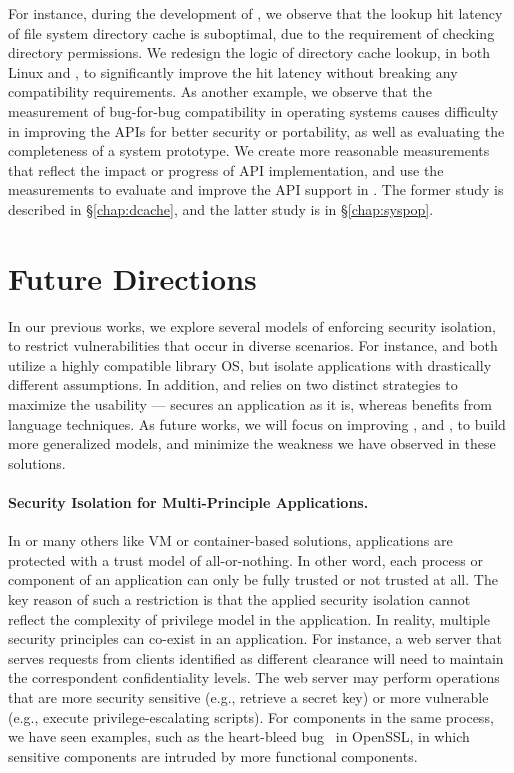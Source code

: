 {For instance, during the development of \graphene{}, we observe that the lookup hit latency of file system directory cache is suboptimal,
due to the requirement of checking directory permissions.
We redesign the logic of
directory cache lookup, in both Linux and \graphene{},
to significantly improve the hit latency without breaking any compatibility requirements.
As another example, we observe that the measurement of bug-for-bug compatibility in operating systems causes difficulty in improving the APIs for better security or portability,
as well as evaluating the completeness of a system prototype.
We create more reasonable measurements
that reflect the impact or progress of API implementation,
and use the measurements to evaluate and improve the API support in \graphene{}.
The former study is described in \S\ref{chap:dcache}, and the latter study is in \S\ref{chap:syspop}.


\section{Future Directions}
In our previous works, we explore several models of enforcing security isolation, to restrict vulnerabilities
that occur in diverse scenarios.
For instance, \graphene{} and \gsgx{} both utilize a highly compatible library OS,
but isolate applications with drastically different assumptions.
In addition, \gsgx{} and \civet{} relies on two distinct strategies to maximize the usability
--- \gsgx{} secures an application as it is, whereas \civet{} benefits from language techniques.
As future works, we will focus on improving \graphene{}, \gsgx{} and \civet{},
to build more generalized models, and minimize the weakness we have observed in these solutions.

\paragraph{Security Isolation for Multi-Principle Applications.}
In \graphene{} or many others like VM or container-based solutions,
applications are protected with a trust model of all-or-nothing.
In other word, each process or component of an application can only be fully trusted or not trusted at all.
The key reason of such a restriction is that the applied security isolation cannot reflect the complexity of privilege model in the application.
In reality, multiple security principles can co-exist in an application.
For instance, a web server that serves requests from clients identified as different clearance
will need to maintain the correspondent confidentiality levels.
The web server may perform operations that are more security sensitive (e.g., retrieve a secret key)
or more vulnerable (e.g., execute privilege-escalating scripts).
For components in the same process, we have seen examples, such as the heart-bleed bug~\citep{heartbleed} in OpenSSL, in which sensitive components are intruded by more functional components.

}
